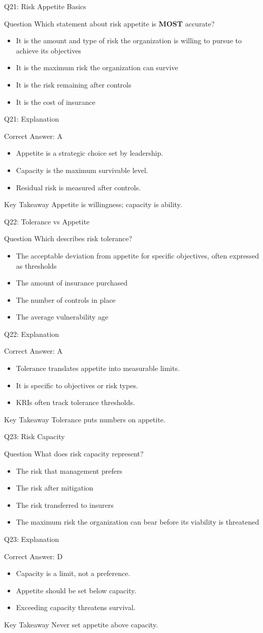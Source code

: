 \documentclass[aspectratio=169]{beamer}
\newcommand{\hq}[7]{%
	\begin{frame}{Q#1: #2}
		\begin{block}{Question}
			#3
		\end{block}
		\begin{itemize}
			#4
		\end{itemize}
	\end{frame}
	\begin{frame}{Q#1: Explanation}
		\begin{block}{Correct Answer: #5}
			\begin{itemize}
				#6
			\end{itemize}
		\end{block}
		\begin{alertblock}{Key Takeaway}
			#7
		\end{alertblock}
	\end{frame}
}
\begin{document}
	\hq{21}{Risk Appetite Basics}
	{Which statement about risk appetite is \textbf{MOST} accurate?}
	{\item[\textbf{(A)}] It is the amount and type of risk the organization is willing to pursue to achieve its objectives
		\item[\textbf{(B)}] It is the maximum risk the organization can survive
		\item[\textbf{(C)}] It is the risk remaining after controls
		\item[\textbf{(D)}] It is the cost of insurance}
	{A}
	{\item Appetite is a strategic choice set by leadership.
		\item Capacity is the maximum survivable level.
		\item Residual risk is measured after controls.}
	{Appetite is willingness; capacity is ability.}
	
	\hq{22}{Tolerance vs Appetite}
	{Which describes risk tolerance?}
	{\item[\textbf{(A)}] The acceptable deviation from appetite for specific objectives, often expressed as thresholds
		\item[\textbf{(B)}] The amount of insurance purchased
		\item[\textbf{(C)}] The number of controls in place
		\item[\textbf{(D)}] The average vulnerability age}
	{A}
	{\item Tolerance translates appetite into measurable limits.
		\item It is specific to objectives or risk types.
		\item KRIs often track tolerance thresholds.}
	{Tolerance puts numbers on appetite.}
	
	\hq{23}{Risk Capacity}
	{What does risk capacity represent?}
	{\item[\textbf{(A)}] The risk that management prefers
		\item[\textbf{(B)}] The risk after mitigation
		\item[\textbf{(C)}] The risk transferred to insurers
		\item[\textbf{(D)}] The maximum risk the organization can bear before its viability is threatened}
	{D}
	{\item Capacity is a limit, not a preference.
		\item Appetite should be set below capacity.
		\item Exceeding capacity threatens survival.}
	{Never set appetite above capacity.}
	
\end{document}
